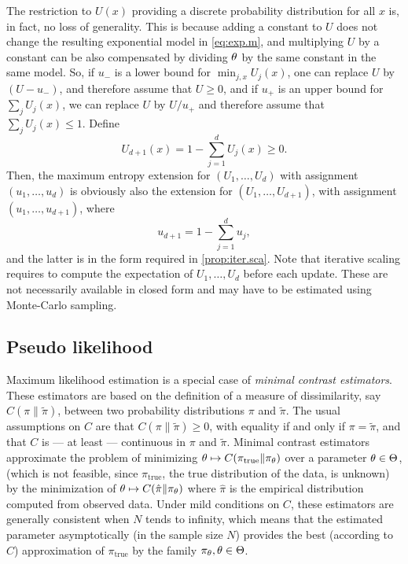 The restriction to $U(x)$ providing a discrete probability distribution
for all $x$ is, in fact, no loss of generality. This is because adding
a constant to $U$ does not change the resulting exponential model in
\cref{eq:exp.m}, and multiplying $U$ by a constant can be also
compensated by dividing $\theta$ by the same constant in the same
model. So, if $u_-$ is a lower bound for $\min_{j, x} U_{j}(x)$, one
can replace $U$
by $(U-u_-)$, and therefore assume that $U \geq 0$, and if $u_+$ is an
upper bound for $\sum_j U_j(x)$, we can replace $U$ by $U/u_+$ and
therefore assume that $\sum_j U_j(x) \leq 1$. Define 
\[
U_{d+1}(x) = 1 - \sum_{j=1}^d U_j(x) \geq 0.
\]
Then, the maximum entropy extension for $(U_1, \ldots, U_d)$ with
assignment $(u_1, \ldots, u_d)$ is obviously also the extension for
$(U_1, \ldots, U_{d+1})$, with assignment $(u_1, \ldots, u_{d+1})$,
where
\[
u_{d+1} = 1 - \sum_{j=1}^d u_j,
\]
and the latter is in the form required in  \cref{prop:iter.sca}. Note that iterative scaling requires to compute the expectation of $U_1, \ldots, U_d$ before each update. These are not necessarily available in closed form and may have to be estimated using Monte-Carlo sampling.



\subsection{Pseudo likelihood}
\label{sec:pseudo.lik}
Maximum likelihood estimation is a special case of {\em minimal
contrast estimators}. These estimators are based on the definition of
a measure of dissimilarity, say $C(\pi \| \tilde \pi)$, between two probability distributions $\pi$
and $\tilde \pi$. The usual assumptions on $C$ are
that $C(\pi \| \tilde \pi) \geq 0$, with equality if and only if $\pi=
\tilde \pi$, and that $C$ is --- at least --- continuous in $\pi$ and
$\tilde\pi$. 
Minimal contrast estimators approximate the problem of
minimizing $\theta \mapsto C(\pi_{\mathrm{true}}\| \pi_\theta)$ over a parameter $\theta\in \Theta$,
(which is not feasible, since $\pi_{\mathrm{true}}$, the true
distribution of the data, is unknown) by the minimization of
$\theta\mapsto C(\hat \pi\| \pi_\theta)$ where $\hat \pi$ is the empirical
distribution computed from  observed data. Under mild conditions on
$C$, these estimators are generally consistent when $N$ tends to
infinity, which means that the estimated parameter asymptotically (in
the sample size $N$) provides the
best (according to $C$) approximation of $\pi_{\mathrm{true}}$ by the family $\pi_\theta, \theta\in\Theta$.

